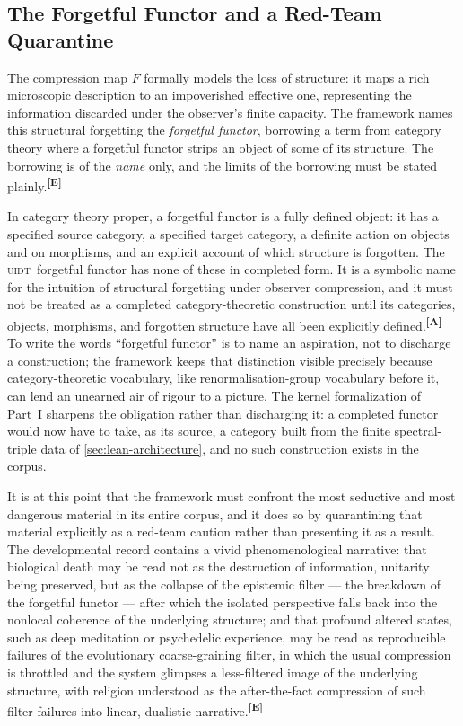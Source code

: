 \documentclass[12pt,a4paper,twoside]{article}
\theoremstyle{plain}
\theoremstyle{definition}
\theoremstyle{remark}
\newcommand{\UIDT}{\textsc{uidt}}
\newcommand{\catmark}[1]{\textsuperscript{\textsf{\textbf{[#1]}}}}
\begin{document}
\subsection{The Forgetful Functor and a Red-Team Quarantine}
\label{subsec:forgetful-functor}

The compression map $F$ formally models the loss of structure: it maps a
rich microscopic description to an impoverished effective one,
representing the information discarded under the observer's finite
capacity. The framework names this structural forgetting the
\emph{forgetful functor}, borrowing a term from category theory where a
forgetful functor strips an object of some of its structure. The
borrowing is of the \emph{name} only, and the limits of the borrowing
must be stated plainly.\catmark{E}

In category theory proper, a forgetful functor is a fully defined
object: it has a specified source category, a specified target category,
a definite action on objects and on morphisms, and an explicit account
of which structure is forgotten. The \UIDT\ forgetful functor has none
of these in completed form. It is a symbolic name for the intuition of
structural forgetting under observer compression, and it must not be
treated as a completed category-theoretic construction until its
categories, objects, morphisms, and forgotten structure have all been
explicitly defined.\catmark{A} To write the words ``forgetful functor''
is to name an aspiration, not to discharge a construction; the framework
keeps that distinction visible precisely because category-theoretic
vocabulary, like renormalisation-group vocabulary before it, can lend an
unearned air of rigour to a picture. The kernel formalization of Part~I
sharpens the obligation rather than discharging it: a completed functor
would now have to take, as its source, a category built from the finite
spectral-triple data of \cref{sec:lean-architecture}, and no such
construction exists in the corpus.

It is at this point that the framework must confront the most seductive
and most dangerous material in its entire corpus, and it does so by
quarantining that material explicitly as a red-team caution rather than
presenting it as a result. The developmental record contains a vivid
phenomenological narrative: that biological death may be read not as the
destruction of information, unitarity being preserved, but as the
collapse of the epistemic filter --- the breakdown of the forgetful
functor --- after which the isolated perspective falls back into the
nonlocal coherence of the underlying structure; and that profound
altered states, such as deep meditation or psychedelic experience, may
be read as reproducible failures of the evolutionary coarse-graining
filter, in which the usual compression is throttled and the system
glimpses a less-filtered image of the underlying structure, with
religion understood as the after-the-fact compression of such
filter-failures into linear, dualistic narrative.\catmark{E}
\end{document}
